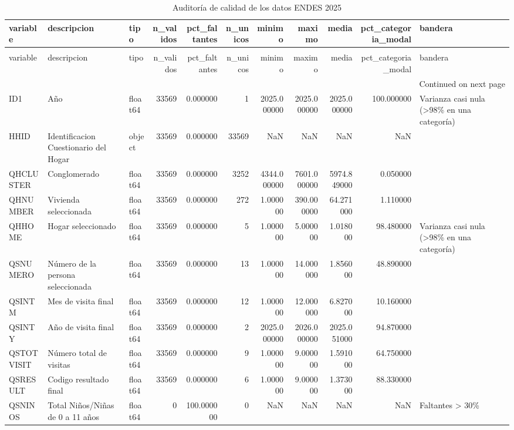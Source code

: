 \begin{longtable}{lllrrrrrrrl}
\caption{Auditoría de calidad de los datos ENDES 2025} \label{tab:tabla_01_calidad_datos} \\
\toprule
variable & descripcion & tipo & n\_validos & pct\_faltantes & n\_unicos & minimo & maximo & media & pct\_categoria\_modal & bandera \\
\midrule
\endfirsthead
\caption[]{Auditoría de calidad de los datos ENDES 2025} \\
\toprule
variable & descripcion & tipo & n\_validos & pct\_faltantes & n\_unicos & minimo & maximo & media & pct\_categoria\_modal & bandera \\
\midrule
\endhead
\midrule
\multicolumn{11}{r}{Continued on next page} \\
\midrule
\endfoot
\bottomrule
\endlastfoot
ID1 & Año & float64 & 33569 & 0.000000 & 1 & 2025.000000 & 2025.000000 & 2025.000000 & 100.000000 & Varianza casi nula (>98\% en una categoría) \\
HHID & Identificacion Cuestionario del Hogar & object & 33569 & 0.000000 & 33569 & NaN & NaN & NaN & NaN &  \\
QHCLUSTER & Conglomerado & float64 & 33569 & 0.000000 & 3252 & 4344.000000 & 7601.000000 & 5974.849000 & 0.050000 &  \\
QHNUMBER & Vivienda seleccionada & float64 & 33569 & 0.000000 & 272 & 1.000000 & 390.000000 & 64.271000 & 1.110000 &  \\
QHHOME & Hogar seleccionado & float64 & 33569 & 0.000000 & 5 & 1.000000 & 5.000000 & 1.018000 & 98.480000 & Varianza casi nula (>98\% en una categoría) \\
QSNUMERO & Número de la persona seleccionada & float64 & 33569 & 0.000000 & 13 & 1.000000 & 14.000000 & 1.856000 & 48.890000 &  \\
QSINTM & Mes de visita final & float64 & 33569 & 0.000000 & 12 & 1.000000 & 12.000000 & 6.827000 & 10.160000 &  \\
QSINTY & Año de visita final & float64 & 33569 & 0.000000 & 2 & 2025.000000 & 2026.000000 & 2025.051000 & 94.870000 &  \\
QSTOTVISIT & Número total de visitas & float64 & 33569 & 0.000000 & 9 & 1.000000 & 9.000000 & 1.591000 & 64.750000 &  \\
QSRESULT & Codigo resultado final & float64 & 33569 & 0.000000 & 6 & 1.000000 & 9.000000 & 1.373000 & 88.330000 &  \\
QSNINOS & Total Niños/Niñas de 0 a 11 años & float64 & 0 & 100.000000 & 0 & NaN & NaN & NaN & NaN & Faltantes > 30\% \\

\end{longtable}
